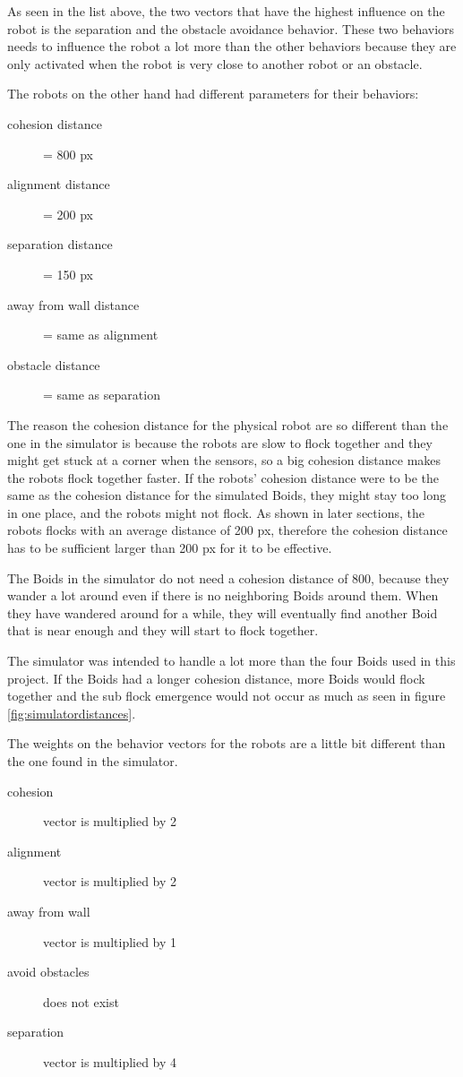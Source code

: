 As seen in the list above, the two vectors that have the highest influence on the robot is the separation and the obstacle avoidance behavior. These two behaviors needs to influence the robot a lot more than the other behaviors because they are only activated when the robot is very close to another robot or an obstacle.

The robots on the other hand had different parameters for their behaviors:
\begin{description}
\item[cohesion distance] = 800 px
\item[alignment distance] = 200 px
\item[separation distance] = 150 px
\item[away from wall distance] = same as alignment
\item[obstacle distance] = same as separation
\end{description}

The reason the cohesion distance for the physical robot are so different than the one in the simulator is because the robots are slow to flock together and they might get stuck at a corner when the sensors, so a big cohesion distance makes the robots flock together faster. If the robots' cohesion distance were to be the same as the cohesion distance for the simulated Boids, they might stay too long in one place, and the robots might not flock. As shown in later sections, the robots flocks with an average distance of 200 px, therefore the cohesion distance has to be sufficient larger than 200 px for it to be effective. 

The Boids in the simulator do not need a cohesion distance of 800, because they wander a lot around even if there is no neighboring Boids around them. When they have wandered around for a while, they will eventually find another Boid that is near enough and they will start to flock together.

The simulator was intended to handle a lot more than the four Boids used in this project. If the Boids had a longer cohesion distance, more Boids would flock together and the sub flock emergence would not occur as much as seen in figure \ref{fig:simulatordistances}.

The weights on the behavior vectors for the robots are a little bit different than the one found in the simulator.
\begin{description}
\item[cohesion] vector is multiplied by 2
\item[alignment] vector is multiplied by 2
\item[away from wall] vector is multiplied by 1
\item[avoid obstacles] does not exist
\item[separation] vector is multiplied by 4
\end{description}

